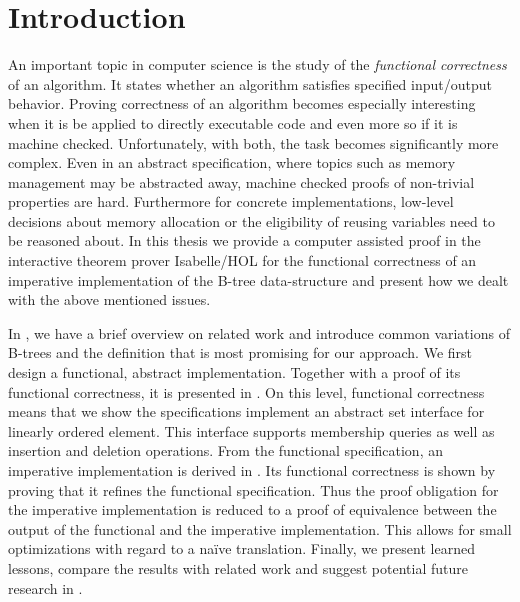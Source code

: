 

\chapter{Introduction}\label{chapter:introduction}

An important topic in computer science is the study of the
\textit{functional correctness} of an algorithm.
It states whether an algorithm satisfies specified
input/output behavior.
Proving correctness of an algorithm
becomes especially interesting when it is be applied
to directly executable code and even more so if it is machine checked.
Unfortunately, with both, the task becomes
significantly more complex.
Even in an abstract specification, where topics such as
memory management may be abstracted away,
machine checked proofs of non-trivial properties
are hard.
Furthermore for concrete implementations,
low-level decisions about memory allocation or
the eligibility of reusing variables need to be
reasoned about.
In this thesis we provide a computer assisted proof in the interactive
theorem prover Isabelle/HOL \parencite{DBLP:books/sp/NipkowPW02} for the functional
correctness of an imperative implementation of the B-tree data-structure
and present how we dealt with the above mentioned issues.



In , we have a brief overview on related
work and introduce common variations of B-trees and
the definition that is most promising for our approach.
We first design a functional, abstract implementation.
Together with a proof of its functional correctness,
it is presented in .
On this level, functional correctness means that we show the specifications
implement an abstract set interface for linearly ordered element.
This interface supports membership queries as well as insertion and deletion operations.
From the functional specification, an imperative implementation is derived in .
Its functional correctness is shown by proving that it refines the functional specification.
Thus the proof obligation for the imperative implementation
is reduced to a proof of equivalence between the output of the
functional and the imperative implementation.
This allows for small optimizations with regard to a na\"ive translation.
Finally, we present learned lessons, compare the results with related work and suggest potential future
research in .

